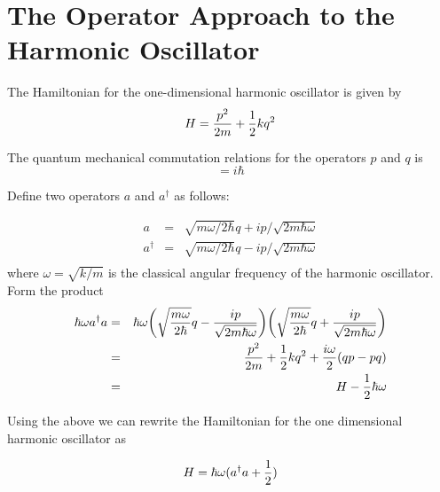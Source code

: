 \section{The Operator Approach to the Harmonic Oscillator}
The Hamiltonian for the one-dimensional harmonic oscillator is given by
\begin{equation}
H = {p^2\over2m} + {1\over 2} k q^2
\end{equation}

The quantum mechanical commutation relations for the operators $p$ and $q$ is 
\begin{equation}[q,p] = i\hbar
\end{equation}

Define two operators $a$ and $a^\dagger$ as follows:

\begin{eqnarray*}
a &=& \sqrt{m\omega/2\hbar}q + ip/\sqrt{2m\hbar\omega}\\
a^\dagger &=& \sqrt{m\omega/2\hbar}q - ip/\sqrt{2m\hbar\omega}\\
\end{eqnarray*}
where $\omega = \sqrt{k/m}$ is the classical angular frequency of the harmonic oscillator.\\

Form the product
\begin{eqnarray*}
 \hbar\omega a^\dagger a &=& \hbar\omega \bigg( \sqrt{ {m\omega\over 2\hbar}} q  - {ip\over\sqrt{2m\hbar\omega}}\bigg) \bigg( \sqrt{ {m\omega\over 2\hbar}} q  + {ip\over\sqrt{2m\hbar\omega}}\bigg)\\
  &=&  {p^2\over2m} + {1\over 2} k q^2  +{i\omega\over2}(qp - pq)\\
  &=& H - {1\over 2} \hbar\omega 
 \end{eqnarray*}
 
 Using the above we can rewrite the Hamiltonian for the one dimensional harmonic oscillator as
 
 \[H = \hbar\omega(a^\dagger a + {1\over 2})\]
